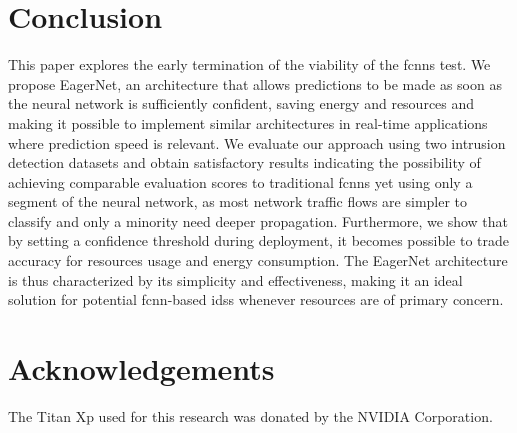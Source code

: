 \documentclass[conference]{IEEEtran}
\begin{document}
\section{Conclusion}

This paper explores the early termination of the viability of the \glspl{fcnn} test. We propose EagerNet, an architecture that allows predictions to be made as soon as the neural network is sufficiently confident, saving energy and resources and making it possible to implement similar architectures in real-time applications where prediction speed is relevant. We evaluate our approach using two intrusion detection datasets and obtain satisfactory results indicating the possibility of achieving comparable evaluation scores to traditional \glspl{fcnn} yet using only a segment of the neural network, as most network traffic flows are simpler to classify and only a minority need deeper propagation.
Furthermore, we show that by setting a confidence threshold during deployment, it becomes possible to trade accuracy for resources usage and energy consumption. The EagerNet architecture is thus characterized by its simplicity and effectiveness, making it an ideal solution for potential \gls{fcnn}-based \glspl{ids} whenever resources are of primary concern.

\section*{Acknowledgements}
The Titan Xp used for this research was donated by the NVIDIA Corporation.



\end{document}
